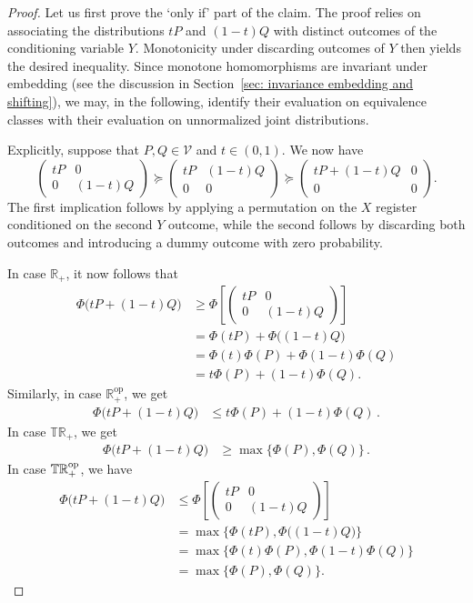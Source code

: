 \documentclass[aps,pra,11pt,onecolumn,nofootinbib,tightenlines]{revtex4-2}
\theoremstyle{definition}
\newcommand{\V}{\mathcal{V}}
\begin{document}
\begin{proof}
Let us first prove the `only if' part of the claim. The proof relies on associating the distributions $tP$ and $(1 - t)Q$ with distinct outcomes of the conditioning variable $Y$. Monotonicity under discarding outcomes of $Y$ then yields the desired inequality. Since monotone homomorphisms are invariant under embedding (see the discussion in
Section~\ref{sec: invariance embedding and shifting}), we may, in the following,
identify their evaluation on equivalence classes with their evaluation on
unnormalized joint distributions.


Explicitly, suppose that $P,Q\in\V$ and $t\in(0,1)$. We now have
\begin{equation}\label{eq:affinechain}
\left(\begin{array}{cc}
tP&0\\
0&(1-t)Q
\end{array}\right)\succeq\left(\begin{array}{cc}
tP&(1-t)Q\\
0&0
\end{array}\right)\succeq\left(\begin{array}{cc}
tP+(1-t)Q&0\\
0&0
\end{array}\right).
\end{equation}
The first implication follows by applying a permutation on the $X$ register conditioned on the second $Y$ outcome, while the second follows by discarding both outcomes and introducing a dummy outcome with zero probability.

In case $\mathbb{R}_+$, it now follows that
\begin{align}
\Phi\big(tP+(1-t)Q\big)&\geq\Phi\left[\left(\begin{array}{cc}
tP&0\\
0&(1-t)Q
\end{array}\right)\right]\\
&=\Phi(tP)+\Phi\big((1-t)Q\big)\\
&=\Phi(t)\Phi(P)+\Phi(1-t)\Phi(Q)\\
&=t\Phi(P)+(1-t)\Phi(Q).
\end{align}
Similarly, in case $\mathbb{R}_+^{\mathrm{op}}$, we get
\begin{align}
\Phi\big(tP+(1-t)Q\big)&\leq t\Phi(P)+(1-t)\Phi(Q) \,.
\end{align}
In case $\mathbb{TR}_+$, we get
\begin{align}
\Phi\big(tP+(1-t)Q\big)&\geq\max\{\Phi(P),\Phi(Q)\} \,.
\end{align}
In case $\mathbb{TR}^{\rm{op}}_+$, we have
\begin{align}
\Phi\big(tP+(1-t)Q\big)&\leq\Phi\left[\left(\begin{array}{cc}
tP&0\\
0&(1-t)Q
\end{array}\right)\right]\\
&=\max\{\Phi(tP),\Phi\big((1-t)Q\big)\}\\
&=\max\{\Phi(t)\Phi(P),\Phi(1-t)\Phi(Q)\}\\
&=\max\{\Phi(P),\Phi(Q)\}.
\end{align}


\end{proof}
\end{document}
